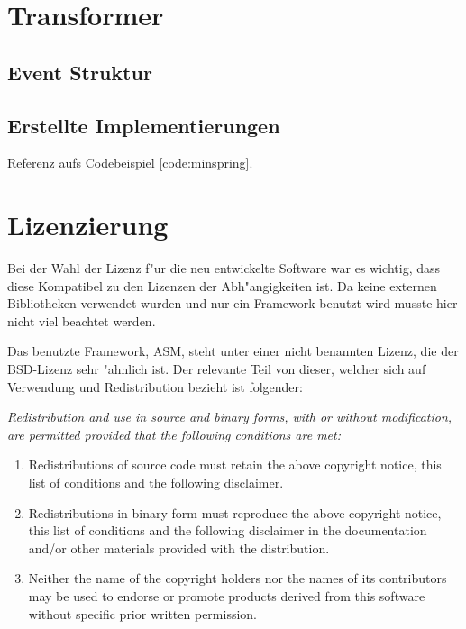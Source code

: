 \section{Transformer} 



\subsection{Event Struktur} 



\subsection{Erstellte Implementierungen} 


Referenz aufs Codebeispiel \ref{code:minspring}.

 

\section{Lizenzierung} 

Bei der Wahl der Lizenz f"ur die neu entwickelte Software war es wichtig, dass diese Kompatibel zu den Lizenzen der Abh"angigkeiten ist. Da keine externen Bibliotheken verwendet wurden und nur ein Framework benutzt wird musste hier nicht viel beachtet werden.

Das benutzte Framework, ASM, steht unter einer nicht benannten Lizenz, die der BSD-Lizenz sehr "ahnlich ist. Der relevante Teil von dieser, welcher sich auf Verwendung und Redistribution bezieht ist folgender:

{\itshape
Redistribution and use in source and binary forms, with or without
modification, are permitted provided that the following conditions
are met:

\begin{enumerate}
	\item Redistributions of source code must retain the above copyright notice, this list of conditions and the following disclaimer.
	\item Redistributions in binary form must reproduce the above copyright notice, this list of conditions and the following disclaimer in the documentation and/or other materials provided with the distribution.
	\item Neither the name of the copyright holders nor the names of its contributors may be used to endorse or promote products derived from this software without specific prior written permission.
\end{enumerate}
}
\cite{asm_license}


